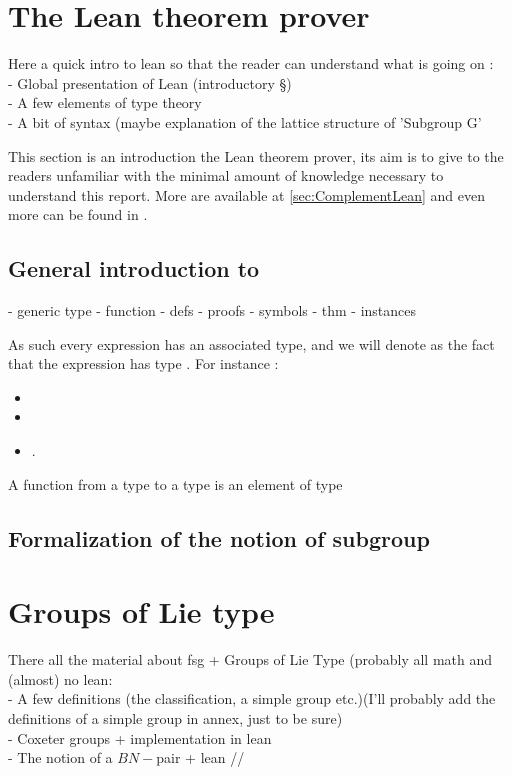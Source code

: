 \section{The Lean theorem prover}
\label{sec:lean-intro}

{\color{green} Here a quick intro to lean so that the reader can understand what is going on : \\
- Global presentation of Lean (introductory §)\\
- A few elements of type theory \\
- A bit of syntax (maybe explanation of the lattice structure of 'Subgroup G'\\ }

This section is an introduction the Lean theorem prover, its aim is to give to the readers unfamiliar with \Lean the minimal amount of knowledge necessary to understand this report. More are available at \ref{sec:ComplementLean} and even more can be found in .

\subsection{General introduction to \Lean}%
\label{sub:Introduction to type theory}
- generic type
- function
- defs
- proofs
    - symbols
    - thm
- instances

   
    As such every \Lean  expression has an associated type, and we will denote as  the fact that the expression  has type . For instance :
\begin{itemize} 
    \item {}
    \item {} 
    \item {}.
\end{itemize}
A function from a type  to a type  is an element of type 


    
\subsection{Formalization of the notion of subgroup}%
\label{sub:Formalization of the notion of subgroup}

\section{Groups of Lie type}
{\color{green} There all the material about fsg + Groups of Lie Type (probably all math and (almost) no lean: \\
- A few definitions (the classification, a simple group etc.)(I'll probably add the definitions of a simple group in annex, just to be sure)\\
- Coxeter groups + implementation in lean \\
- The notion of a $BN-$pair + lean //}


